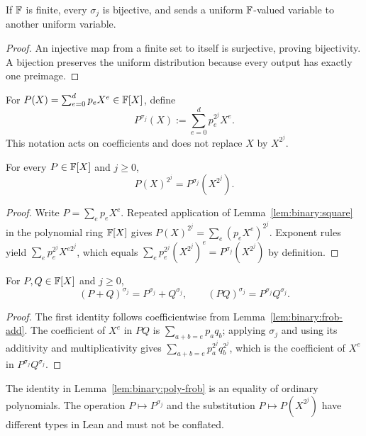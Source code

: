 \begin{corollary}\label{cor:binary:frob-bijective}
If $\mathbb{F}$ is finite, every $\sigma_j$ is bijective, and sends a uniform $\mathbb{F}$-valued variable to another uniform variable.
\end{corollary}
\begin{proof}
An injective map from a finite set to itself is surjective, proving bijectivity. A bijection preserves the uniform distribution because every output has exactly one preimage.
\end{proof}

\begin{definition}\label{def:binary:poly-frob}
For $P(X)=\sum_{e=0}^{d}p_eX^e\in\mathbb{F}[X]$, define
\[
 P^{\sigma_j}(X):=\sum_{e=0}^{d}p_e^{2^j}X^e.
\]
This notation acts on coefficients and does not replace $X$ by $X^{2^j}$.
\end{definition}

\begin{lemma}\label{lem:binary:poly-frob}
For every $P\in\mathbb{F}[X]$ and $j\geq0$,
\[
 \boxed{P(X)^{2^j}=P^{\sigma_j}(X^{2^j}).}
\]
\end{lemma}
\begin{proof}
Write $P=\sum_ep_eX^e$. Repeated application of Lemma~\ref{lem:binary:square} in the polynomial ring $\mathbb{F}[X]$ gives
$P(X)^{2^j}=\sum_e(p_eX^e)^{2^j}$. Exponent rules yield
$\sum_ep_e^{2^j}X^{e2^j}$, which equals
$\sum_ep_e^{2^j}(X^{2^j})^e=P^{\sigma_j}(X^{2^j})$ by definition.
\end{proof}

\begin{lemma}\label{lem:binary:poly-frob-mult}
For $P,Q\in\mathbb{F}[X]$ and $j\geq0$,
\[
 (P+Q)^{\sigma_j}=P^{\sigma_j}+Q^{\sigma_j},\qquad
 (PQ)^{\sigma_j}=P^{\sigma_j}Q^{\sigma_j}.
\]
\end{lemma}
\begin{proof}
The first identity follows coefficientwise from Lemma~\ref{lem:binary:frob-add}. The coefficient of $X^e$ in $PQ$ is $\sum_{a+b=e}p_aq_b$; applying $\sigma_j$ and using its additivity and multiplicativity gives
$\sum_{a+b=e}p_a^{2^j}q_b^{2^j}$, which is the coefficient of $X^e$ in $P^{\sigma_j}Q^{\sigma_j}$.
\end{proof}

\begin{remark}
The identity in Lemma~\ref{lem:binary:poly-frob} is an equality of ordinary polynomials. The operation $P\mapsto P^{\sigma_j}$ and the substitution $P\mapsto P(X^{2^j})$ have different types in Lean and must not be conflated.
\end{remark}
